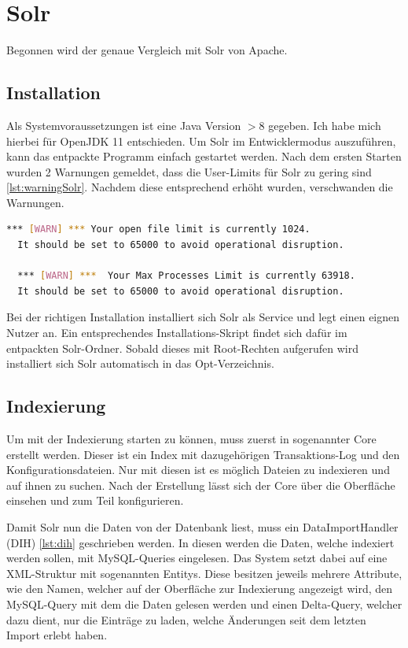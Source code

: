 
\section{Solr}

Begonnen wird der genaue Vergleich mit Solr von Apache.

\subsection{Installation}

Als Systemvoraussetzungen ist eine Java Version $> 8$ gegeben. Ich habe mich hierbei für OpenJDK 11 entschieden. Um Solr im Entwicklermodus auszuführen, kann das entpackte Programm einfach gestartet werden. 
Nach dem ersten Starten wurden 2 Warnungen gemeldet, dass die User-Limits für Solr zu gering sind \ref{lst:warningSolr}. Nachdem diese entsprechend erhöht wurden, verschwanden die Warnungen.

\begin{lstlisting}[language=bash, frame=single, label={lst:warningSolr}] 
  *** [WARN] *** Your open file limit is currently 1024.
  It should be set to 65000 to avoid operational disruption.

  *** [WARN] ***  Your Max Processes Limit is currently 63918.
  It should be set to 65000 to avoid operational disruption.
\end{lstlisting}

Bei der richtigen Installation installiert sich Solr als Service und legt einen eignen Nutzer an. Ein entsprechendes Installations-Skript findet sich dafür im entpackten Solr-Ordner. Sobald dieses mit Root-Rechten aufgerufen wird installiert sich Solr automatisch in das Opt-Verzeichnis.

\subsection{Indexierung}

Um mit der Indexierung starten zu können, muss zuerst in sogenannter Core erstellt werden. Dieser ist ein Index mit dazugehörigen Transaktions-Log und den Konfigurationsdateien. Nur mit diesen ist es möglich Dateien zu indexieren und auf ihnen zu suchen. Nach der Erstellung lässt sich der Core über die Oberfläche einsehen und zum Teil konfigurieren.

Damit Solr nun die Daten von der Datenbank liest, muss ein DataImportHandler (DIH) \ref{lst:dih} geschrieben werden. In diesen werden die Daten, welche indexiert werden sollen, mit MySQL-Queries eingelesen. Das System setzt dabei auf eine XML-Struktur mit sogenannten Entitys. Diese besitzen jeweils mehrere Attribute, wie den Namen, welcher auf der Oberfläche zur Indexierung angezeigt wird, den MySQL-Query mit dem die Daten gelesen werden und einen Delta-Query, welcher dazu dient, nur die Einträge zu laden, welche Änderungen seit dem letzten Import erlebt haben. 


